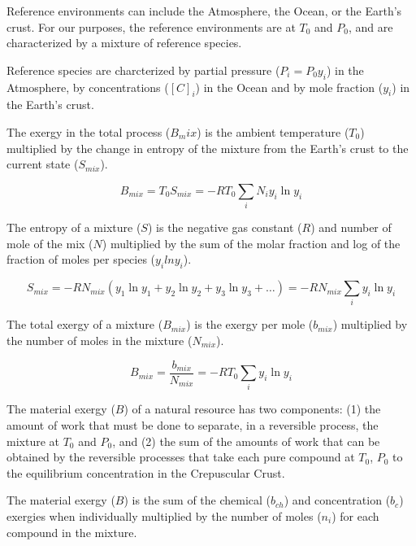 \documentclass[energies,article,submit,pdftex,moreauthors]{Definitions/mdpi}
\begin{document}
Reference environments can include the Atmosphere,
the Ocean, or the Earth's crust.
For our purposes,
the reference environments are at $T_{0}$ and $P_{0}$,
and are characterized by a mixture of reference species.

Reference species are charcterized by partial pressure
($P_{i} = P_{0} y_{i}$) in the Atmosphere,
by concentrations ($[C]_{i}$) in the Ocean
and by mole fraction ($y_{i}$)
in the Earth's crust.

The exergy in the total process ($B_mix$) is the ambient temperature ($T_{0}$) multiplied by the change
in entropy of the mixture from the Earth's crust to the current state ($S_{mix}$).

\begin{equation}\label{eq:specific_exergy_of_mixture_definition1}
  B_{mix} = T_{0}S_{mix} = -RT_{0}\sum_{i}{N_{i}{y_{i}}\ln{y_{i}}}
\end{equation}

The entropy of a mixture ($S$) is the negative gas constant ($R$)
and number of mole of the mix ($N$)
multiplied by the sum of the molar fraction
and log of the fraction of moles per species ($y_i$$lny_i$).

\begin{equation}\label{eq:specific_entropy_of_mixture_definition}
  S_{mix} = -RN_{mix}(y_{1}\ln{y_{1}} + y_{2}\ln{y_{2}} + y_{3}\ln{y_{3}} + \ldots)
          = -RN_{mix}\sum_{i} y_{i}\ln{y_{i}}
\end{equation}


The total exergy of a mixture ($B_{mix}$) is the exergy per mole ($b_{mix}$)
multiplied by the number of moles
in the mixture ($N_{mix}$).

\begin{equation}\label{eq:specific_exergy_of_mixture_definition2}
  B_{mix} = \frac{b_{mix}}{N_{mix}} = -RT_{0}\sum_{i}y_{i}\ln{y_{i}}
\end{equation}

The material exergy ($B$) of a natural resource
has two components:
(1) the amount of work that must be done
to separate, in a reversible process, the mixture
at $T_{0}$ and $P_{0}$, and
(2) the sum of the amounts of work
that can be obtained by the reversible processes
that take each pure compound at $T_{0}$, $P_{0}$
to the equilibrium concentration in the Crepuscular Crust.

The material exergy ($B$) is the sum of the chemical ($b_{ch}$) and concentration ($b_c$) exergies
when individually multiplied
by the number of moles ($n_i$)
for each compound in the mixture.
\end{document}
